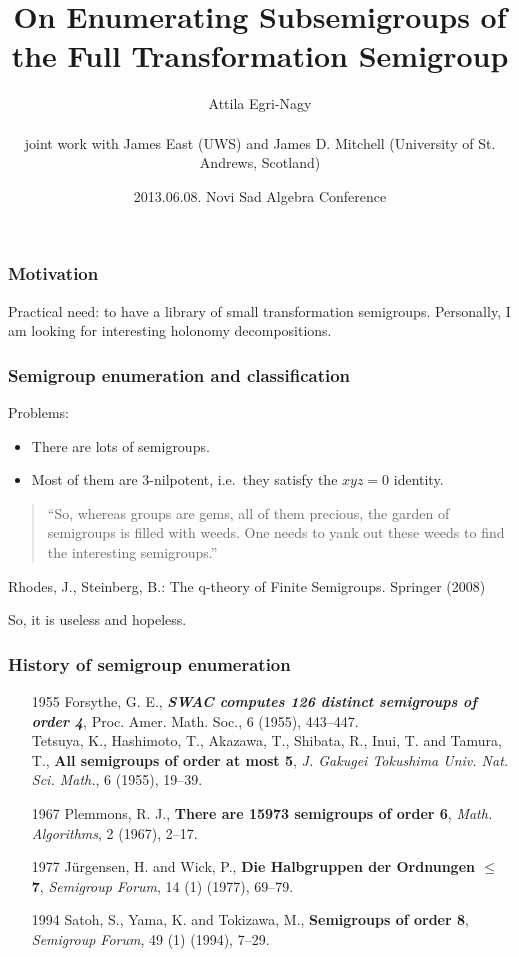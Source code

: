 \documentclass{beamer}
\newcommand{\jump}{\vskip6pt}
\begin{document}
\title[Subsemigroup Enumeration]{On Enumerating Subsemigroups of the Full Transformation Semigroup }
\author[e-n@]{Attila Egri-Nagy\\\ \\joint work with James East (UWS) and James D. Mitchell (University of St. Andrews, Scotland)}
\date[NSAC 2013]{2013.06.08. Novi Sad Algebra Conference}

\begin{frame}
\titlepage
\end{frame}

\begin{frame}\frametitle{Motivation}
Practical need: to have a library of small transformation semigroups.
\jump\jump
Personally, I am looking for interesting holonomy decompositions. 
\end{frame}

\begin{frame}\frametitle{Semigroup enumeration and classification}
Problems:
\begin{itemize}
\item There are lots of semigroups.
\item Most of them are 3-nilpotent, i.e.\ they satisfy the $xyz=0$ identity.
\end{itemize}
\jump

\begin{quote}
``So, whereas groups are
gems, all of them precious, the garden of semigroups is filled with weeds. One
needs to yank out these weeds to find the interesting semigroups.''
\end{quote}
Rhodes, J., Steinberg, B.: The q-theory of Finite Semigroups. Springer (2008)

\jump
\jump

So, it is useless and hopeless. 
\end{frame}

\begin{frame}\frametitle{History of semigroup enumeration}
\begin{enumerate}
\item[1955] Forsythe, G. E., \textbf{\emph{SWAC computes 126 distinct semigroups of order 4}}, Proc. Amer. Math. Soc., 6 (1955), 443--447.
\\\vskip6pt
Tetsuya, K., Hashimoto, T., Akazawa, T., Shibata, R., Inui, T. and Tamura, T., \textbf{{All semigroups of order at most 5}}, \emph{J. Gakugei Tokushima Univ. Nat. Sci. Math.}, 6 (1955), 19--39.
\item[1967] Plemmons, R. J., \textbf{There are 15973 semigroups of order 6}, \emph{Math. Algorithms}, 2 (1967), 2--17. 
\item[1977]J\"urgensen, H. and Wick, P., \textbf{Die Halbgruppen der Ordnungen  $\mathbf{\leq}$ 7}, \emph{Semigroup Forum}, 14 (1) (1977), 69--79.
\item[1994]Satoh, S., Yama, K. and Tokizawa, M., \textbf{Semigroups of order 8}, \emph{Semigroup Forum}, 49 (1) (1994), 7--29.  
\end{enumerate}
\end{frame}
\end{document}
